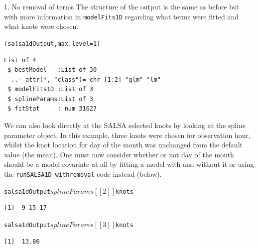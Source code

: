 \begin{block}{1. No removal of terms}
\noindent The structure of the output is the same as before but with more information in {\tt modelFits1D} regarding what terms were fitted and what knots were chosen.

\begin{knitrout}\footnotesize
{}\color{fgcolor}\begin{kframe}
\begin{alltt}
(salsa1dOutput, max.level = 1)
\begin{verbatim}
List of 4
 $ bestModel   :List of 30
  ..- attr(*, "class")= chr [1:2] "glm" "lm"
 $ modelFits1D :List of 3
 $ splineParams:List of 3
 $ fitStat     : num 31627
\end{verbatim}
\end{alltt}
\end{kframe}
\end{knitrout}

\noindent We can also look directly at the SALSA selected knots by looking at the spline parameter object.  In this example, three knots were chosen for observation hour, whilst the knot location for day of the month was unchanged from the default value (the mean).  One must now consider whether or not day of the month should be a model covariate at all by fitting a model with and without it or using the {\tt runSALSA1D\_withremoval} code instead (below).

\begin{knitrout}\footnotesize
{}\color{fgcolor}\begin{kframe}
\begin{alltt}
salsa1dOutput$splineParams[[2]]$knots
\begin{verbatim}
[1]  9 15 17
\end{verbatim}
salsa1dOutput$splineParams[[3]]$knots
\begin{verbatim}
[1]  13.86
\end{verbatim}
\end{alltt}
\end{kframe}
\end{knitrout}
\end{block}

